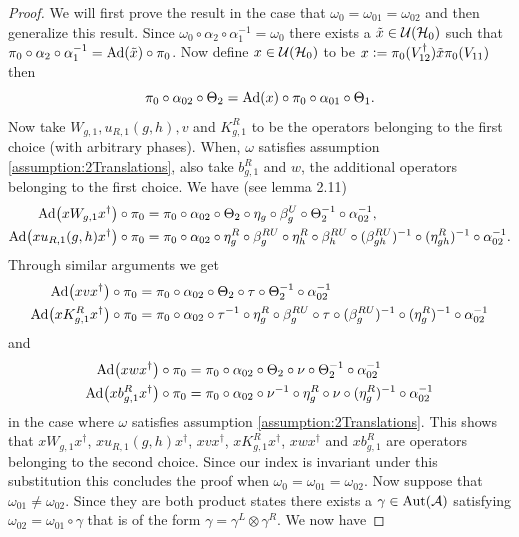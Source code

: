 \documentclass[11pt,a4paper,twoside]{article}
\numberwithin{equation}{section}
\begin{document}
	\begin{proof}
		We will first prove the result in the case that $\omega_0=\omega_{01}=\omega_{02}$ and then generalize this result. Since $\omega_0\circ\alpha_2\circ\alpha_1^{-1}=\omega_0$ there exists a $\tilde{x}\in\mathcal U(\mathcal H_0)$ such that $\pi_0\circ\alpha_2\circ\alpha_1^{-1}=\Ad{\tilde{x}}\circ\pi_0$. Now define $x\in\mathcal U(\mathcal H_0)$ to be $x\vcentcolon= \pi_0(V_{12}^\dagger)\tilde{x} \pi_0(V_{11})$ then
		\begin{equation}
			\pi_0\circ\alpha_{02}\circ\Theta_2=\Ad{x}\circ\pi_0\circ\alpha_{01}\circ\Theta_1.
		\end{equation}
		Now take $W_{g,1},u_{R,1}(g,h), v$ and $K^R_{g,1}$ to be the operators belonging to the first choice (with arbitrary phases). When, $\omega$ satisfies assumption \ref{assumption:2Translations}, also take $b^R_{g,1}$ and $w$, the additional operators belonging to the first choice.
		We have (see \cite{ogata2021h3gmathbb} lemma 2.11)
		\begin{align}
			\Ad{xW_{g,1}x^\dagger}\circ\pi_0&=\pi_0\circ \alpha_{02}\circ\Theta_2\circ\eta_g\circ\beta_g^U\circ\Theta_2^{-1}\circ\alpha_{02}^{-1},\\
			\Ad{xu_{R,1}(g,h)x^\dagger}\circ\pi_0&=\pi_0\circ \alpha_{02}\circ\eta_g^R\circ\beta_g^{RU}\circ\eta_h^R\circ\beta_{h}^{RU}\circ(\beta_{gh}^{RU})^{-1}\circ(\eta_{gh}^R)^{-1}\circ\alpha_{02}^{-1}.
		\end{align}
		Through similar arguments we get
		\begin{align}
			\Ad{xvx^\dagger}\circ\pi_0&=\pi_0\circ\alpha_{02}\circ\Theta_2\circ\tau\circ\Theta_2^{-1}\circ\alpha_{02}^{-1}\\
			\Ad{xK^R_{g,1}x^\dagger}\circ\pi_0&=\pi_0\circ \alpha_{02}\circ\tau^{-1}\circ\eta_g^R\circ\beta_g^{RU}\circ\tau\circ(\beta_g^{RU})^{-1}\circ(\eta^R_g)^{-1}\circ\alpha_{02}^{-1}
		\end{align}
		and
		\begin{align}
			\Ad{xwx^\dagger}\circ\pi_0&=\pi_0\circ\alpha_{02}\circ\Theta_2\circ\nu\circ\Theta_2^{-1}\circ\alpha_{02}^{-1}\\
			\Ad{xb^R_{g,1}x^\dagger}\circ\pi_0&=\pi_0\circ \alpha_{02}\circ\nu^{-1}\circ\eta_g^R\circ\nu\circ(\eta_g^R)^{-1}\circ\alpha_{02}^{-1}
		\end{align}
		in the case where $\omega$ satisfies assumption \ref{assumption:2Translations}. This shows that $xW_{g,1}x^\dagger$, $xu_{R,1}(g,h)x^\dagger$, $xvx^\dagger$, $xK^R_{g,1}x^\dagger$, $xwx^\dagger$ and $x b^R_{g,1}$ are operators belonging to the second choice. Since our index is invariant under this substitution this concludes the proof when $\omega_0=\omega_{01}=\omega_{02}$. Now suppose that $\omega_{01}\neq\omega_{02}$. Since they are both product states there exists a $\gamma\in\Aut{\AA}$ satisfying $\omega_{02}=\omega_{01}\circ\gamma$ that is of the form $\gamma=\gamma^L\otimes\gamma^R$. We now have

\end{proof}
\end{document}
